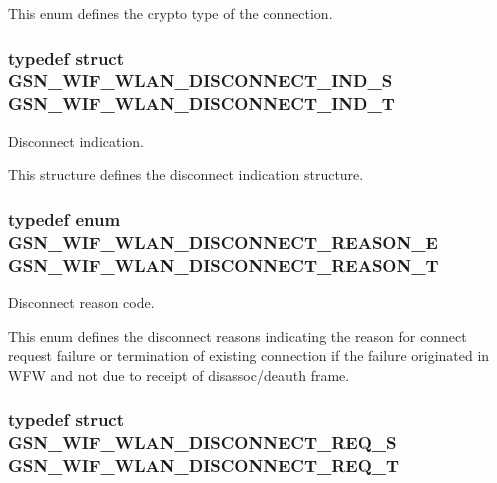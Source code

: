 This enum defines the crypto type of the connection. \hypertarget{a00677_ga12e53679e526d82e7e99a05a000dbdf8}{
\subsubsection[{GSN\_\-WIF\_\-WLAN\_\-DISCONNECT\_\-IND\_\-T}]{\setlength{\rightskip}{0pt plus 5cm}typedef struct {\bf GSN\_\-WIF\_\-WLAN\_\-DISCONNECT\_\-IND\_\-S}  {\bf GSN\_\-WIF\_\-WLAN\_\-DISCONNECT\_\-IND\_\-T}}}
\label{a00677_ga12e53679e526d82e7e99a05a000dbdf8}


Disconnect indication. 

This structure defines the disconnect indication structure. \hypertarget{a00677_ga59f311fc4d769ed3a162e48be5ea59aa}{
\subsubsection[{GSN\_\-WIF\_\-WLAN\_\-DISCONNECT\_\-REASON\_\-T}]{\setlength{\rightskip}{0pt plus 5cm}typedef enum {\bf GSN\_\-WIF\_\-WLAN\_\-DISCONNECT\_\-REASON\_\-E}  {\bf GSN\_\-WIF\_\-WLAN\_\-DISCONNECT\_\-REASON\_\-T}}}
\label{a00677_ga59f311fc4d769ed3a162e48be5ea59aa}


Disconnect reason code. 

This enum defines the disconnect reasons indicating the reason for connect request failure or termination of existing connection if the failure originated in WFW and not due to receipt of disassoc/deauth frame. \hypertarget{a00677_gaf8a8c7854be001d295e7a84a9512a1d7}{
\subsubsection[{GSN\_\-WIF\_\-WLAN\_\-DISCONNECT\_\-REQ\_\-T}]{\setlength{\rightskip}{0pt plus 5cm}typedef struct {\bf GSN\_\-WIF\_\-WLAN\_\-DISCONNECT\_\-REQ\_\-S}  {\bf GSN\_\-WIF\_\-WLAN\_\-DISCONNECT\_\-REQ\_\-T}}}
\label{a00677_gaf8a8c7854be001d295e7a84a9512a1d7}


